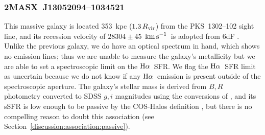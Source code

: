 \documentclass[twocolumn,twocolappendix,tighten,times]{aastex6}
\newcommand{\Ha}{\ensuremath{{\rm H}\alpha}}
\newcommand{\kms}{\ensuremath{{\rm km\,s}^{-1}}}
\begin{document}
\subsubsection{2MASX~J13052094--1034521}
\label{indiv:galaxies:2masxj1305-10b}

This massive galaxy is located 353~kpc ($1.3\,R_{\rm vir}$) from the 
PKS~1302--102 sight line, and its recession velocity of $28304\pm45$~\kms\ 
is adopted from 6dF \citep{jones05}. Unlike the previous galaxy, we do have an 
optical spectrum in hand, which shows no emission lines; thus we are unable to 
measure the galaxy's metallicity 
but we are able to set a spectroscopic limit on the \Ha\ SFR. We flag the \Ha\ 
SFR limit as uncertain because we do not know if any \Ha\ emission is present 
outside of the spectroscopic aperture. The galaxy's stellar mass is derived from 
$B,R$ photometry \citep{prochaska11b} converted to SDSS $g,i$ magnitudes using the 
conversions of \citet{jester05}, and its sSFR is low enough to be passive by the 
COS-Halos definition \citep{tumlinson11}, but there is no compelling reason to 
doubt this association (see Section~\ref{discussion:association:passive}).




\end{document}
